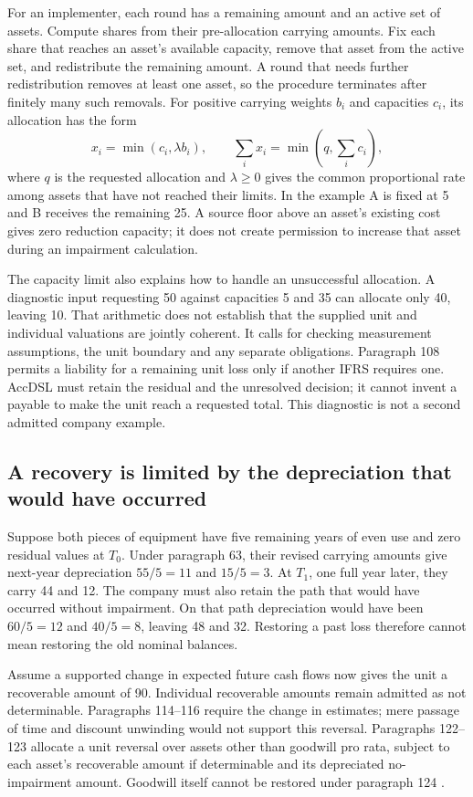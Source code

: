 For an implementer, each round has a remaining amount and an active set of
assets. Compute shares from their pre-allocation carrying amounts. Fix each
share that reaches an asset's available capacity, remove that asset from the
active set, and redistribute the remaining amount. A round that needs further
redistribution removes at least one asset, so the procedure terminates after
finitely many such removals. For positive carrying weights $b_i$ and
capacities $c_i$, its allocation has the form
\[
 x_i=\min(c_i,\lambda b_i),\qquad
 \sum_i x_i=\min\!\left(q,\sum_i c_i\right),
\]
where $q$ is the requested allocation and $\lambda\geq0$ gives the common
proportional rate among assets that have not reached their limits. In the
example A is fixed at 5 and B receives the remaining 25. A source floor above
an asset's existing cost gives zero reduction capacity; it does not create
permission to increase that asset during an impairment calculation.

The capacity limit also explains how to handle an unsuccessful allocation.
A diagnostic input requesting 50 against capacities 5 and 35 can allocate
only 40, leaving 10. That arithmetic does not establish that the supplied
unit and individual valuations are jointly coherent. It calls for checking
measurement assumptions, the unit boundary and any separate obligations.
Paragraph 108 permits a liability for a remaining unit loss only if another
IFRS requires one. AccDSL must retain the residual and the unresolved decision;
it cannot invent a payable to make the unit reach a requested total. This
diagnostic is not a second admitted company example.

\subsection{A recovery is limited by the depreciation that would have occurred}
\label{sec:impairment-reversal-memory}

Suppose both pieces of equipment have five remaining years of even use and
zero residual values at $T_0$. Under paragraph 63, their revised carrying
amounts give next-year depreciation $55/5=11$ and $15/5=3$. At $T_1$, one
full year later, they carry 44 and 12. The company must also retain the path
that would have occurred without impairment. On that path depreciation would
have been $60/5=12$ and $40/5=8$, leaving 48 and 32. Restoring a past loss
therefore cannot mean restoring the old nominal balances.

Assume a supported change in expected future cash flows now gives the unit a
recoverable amount of 90. Individual recoverable amounts remain admitted as
not determinable. Paragraphs 114--116 require the change in estimates; mere
passage of time and discount unwinding would not support this reversal.
Paragraphs 122--123 allocate a unit reversal over assets other than goodwill
pro rata, subject to each asset's recoverable amount if determinable and its
depreciated no-impairment amount. Goodwill itself cannot be restored under
paragraph 124 \citep{eu20231803}.

